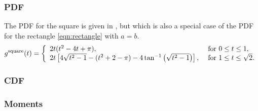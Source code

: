 \subsubsection{PDF}

The PDF for the square is given in
\cite{philip:_probab_distr_distan_between_two,weisstein:_squar_line_picking},
but which is also a special case of the PDF for the rectangle
\eqref{eqn:rectangle} with $a=b$.
\begin{equation}
  \label{eq:square_line}
  g^{\rm square}(t) = \left\{ \begin{array}{ll}
      2t (t^2-4t+\pi), & \mbox{ for } 0 \leq t \leq 1, \\
      2t \left[4 \sqrt{t^2-1} - (t^2+2-\pi) - 4 \tan^{-1} \left(\sqrt{t^2-1} \right)\right], 
               & \mbox{ for } 1 \leq t \leq \sqrt{2} . \\ 
    \end{array} \right.
\end{equation}

\subsubsection{CDF}


\subsubsection{Moments}


